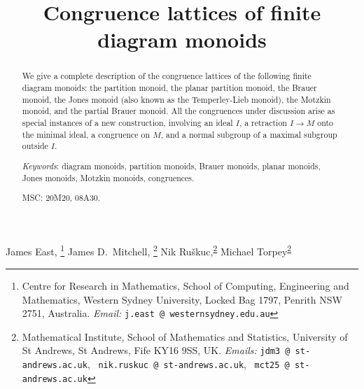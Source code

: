 \documentclass[11pt,a4paper]{article}
\newcommand{\1}{\id_n}
\numberwithin{equation}{section}
\theoremstyle{definition}
\begin{document}
\title{Congruence lattices of finite diagram monoids\vspace{-5ex}}
\author{}
\date{}

\renewcommand{\thefootnote}{\fnsymbol{footnote}}

\maketitle
\begin{center}
{\large 
%
James East,%
\hspace{-.3em}\footnote{Centre for Research in Mathematics, School of Computing, Engineering and Mathematics, Western Sydney University, Locked Bag 1797, Penrith NSW 2751, Australia. {\it Email:} {\tt j.east\,@\,westernsydney.edu.au}}
%
James D.~Mitchell,%
\hspace{-.2em}\footnote{\label{footnote:JDM}Mathematical Institute, School of Mathematics and Statistics, University of St Andrews, St Andrews, Fife KY16 9SS, UK. {\it Emails:} {\tt jdm3\,@\,st-andrews.ac.uk}, \ {\tt nik.ruskuc\,@\,st-andrews.ac.uk}, \ {\tt mct25\,@\,st-andrews.ac.uk}}
%
Nik Ru\v skuc,\hspace{-.2em}\textsuperscript{\ref{footnote:JDM}}
%
Michael Torpey\textsuperscript{\ref{footnote:JDM}}
}
%
\end{center}

\setcounter{footnote}{0}

\renewcommand{\thefootnote}{\arabic{footnote}}


\vspace{-0.5cm}

\begin{abstract}
We give a complete description of the congruence lattices of the following finite diagram monoids: the partition monoid, the planar partition monoid, the Brauer monoid, the Jones monoid (also known as the Temperley-Lieb monoid), the Motzkin monoid, and the partial Brauer monoid.  All the congruences under discussion arise as special instances of a new construction, involving an ideal $I$, a retraction $I\rightarrow M$ onto the minimal ideal, a congruence on $M$, and a normal subgroup of a maximal subgroup outside $I$.

  \textit{Keywords}: diagram monoids, partition monoids, Brauer monoids, planar
  monoids, Jones monoids, Motzkin monoids, congruences.

  MSC: 20M20, 08A30.
\end{abstract}

\end{document}
